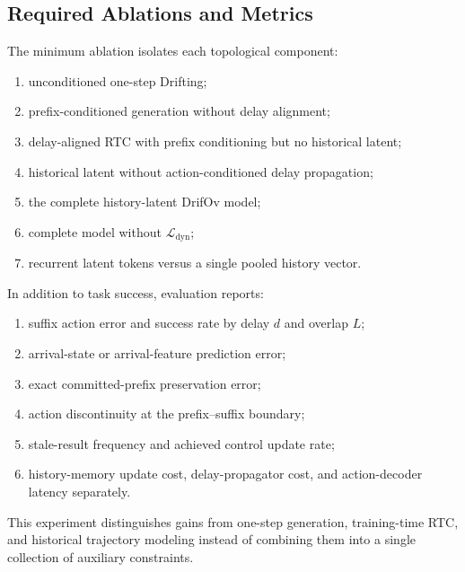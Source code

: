 \subsection{Required Ablations and Metrics}

The minimum ablation isolates each topological component:
\begin{enumerate}
    \item unconditioned one-step Drifting;
    \item prefix-conditioned generation without delay alignment;
    \item delay-aligned RTC with prefix conditioning but no historical latent;
    \item historical latent without action-conditioned delay propagation;
    \item the complete history-latent DrifOv model;
    \item complete model without \(\mathcal{L}_{\mathrm{dyn}}\);
    \item recurrent latent tokens versus a single pooled history vector.
\end{enumerate}

In addition to task success, evaluation reports:
\begin{enumerate}
    \item suffix action error and success rate by delay \(d\) and overlap \(L\);
    \item arrival-state or arrival-feature prediction error;
    \item exact committed-prefix preservation error;
    \item action discontinuity at the prefix--suffix boundary;
    \item stale-result frequency and achieved control update rate;
    \item history-memory update cost, delay-propagator cost, and action-decoder
          latency separately.
\end{enumerate}

This experiment distinguishes gains from one-step generation, training-time
RTC, and historical trajectory modeling instead of combining them into a
single collection of auxiliary constraints.
